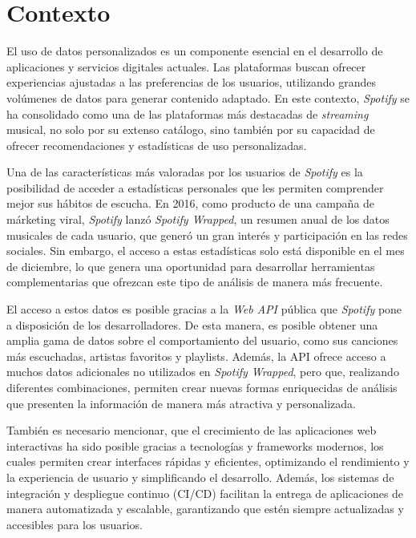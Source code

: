 \section{Contexto} \label{ch:contexto}

El uso de datos personalizados es un componente esencial en el desarrollo de aplicaciones y servicios digitales actuales. Las plataformas buscan ofrecer experiencias ajustadas a las preferencias de los usuarios, utilizando grandes volúmenes de datos para generar contenido adaptado. En este contexto, \textit{Spotify} se ha consolidado como una de las plataformas más destacadas de \textit{streaming} musical, no solo por su extenso catálogo, sino también por su capacidad de ofrecer recomendaciones y estadísticas de uso personalizadas.

Una de las características más valoradas por los usuarios de \textit{Spotify} es la posibilidad de acceder a estadísticas personales que les permiten comprender mejor sus hábitos de escucha. En 2016, como producto de una campaña de márketing viral, \textit{Spotify} lanzó \textit{Spotify Wrapped}, un resumen anual de los datos musicales de cada usuario, que generó un gran interés y participación en las redes sociales. Sin embargo, el acceso a estas estadísticas solo está disponible en el mes de diciembre, lo que genera una oportunidad para desarrollar herramientas complementarias que ofrezcan este tipo de análisis de manera más frecuente.

El acceso a estos datos es posible gracias a la \textit{Web API} pública que \textit{Spotify} pone a disposición de los desarrolladores. De esta manera, es posible obtener una amplia gama de datos sobre el comportamiento del usuario, como sus canciones más escuchadas, artistas favoritos y playlists. Además, la API ofrece acceso a muchos datos adicionales no utilizados en \textit{Spotify Wrapped}, pero que, realizando diferentes combinaciones, permiten crear nuevas formas enriquecidas de análisis que presenten la información de manera más atractiva y personalizada.

También es necesario mencionar, que el crecimiento de las aplicaciones web interactivas ha sido posible gracias a tecnologías y frameworks modernos, los cuales permiten crear interfaces rápidas y eficientes, optimizando el
rendimiento y la experiencia de usuario y simplificando el desarrollo. Además, los sistemas de integración y despliegue continuo (CI/CD) facilitan la entrega de aplicaciones de manera automatizada y escalable, garantizando que estén siempre actualizadas y accesibles para los usuarios.

